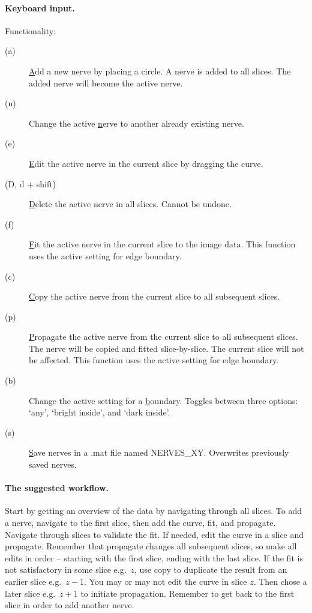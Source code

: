 \documentclass[paper=a4, fontsize=8pt]{article}
\begin{document}
\paragraph{Keyboard input.} Functionality:
\begin{description}
		\item[(a)] \underline{A}dd a new nerve by placing a circle. A nerve is added to all slices. The added nerve will become the active nerve.
		\item[(n)] Change the active \underline{n}erve to another already existing nerve. 
		\item[(e)] \underline{E}dit the active nerve in the current slice by dragging the curve.
		\item[(D, d + shift)] \underline{D}elete the active nerve in all slices. Cannot be undone.
		\item[(f)] \underline{F}it the active nerve in the current slice to the image data. This function uses the active setting for edge boundary. %
		\item[(c)] \underline{C}opy the active nerve from the current slice to all subsequent slices. %
		\item[(p)] \underline{P}ropagate the active nerve from the current slice to all subsequent slices. The nerve will be copied and fitted slice-by-slice. The current slice will not be affected. This function uses the active setting for edge boundary. %
		\item[(b)] Change the active setting for a \underline{b}oundary. Toggles between three options: `any', `bright inside', and `dark inside'.
		\item[(s)] \underline{S}ave nerves in a .mat file named NERVES\_XY. Overwrites previously saved nerves.
\end{description}

\paragraph{The suggested workflow.}
Start by getting an overview of the data by navigating through all slices. To add a nerve, navigate to the first slice, then add the curve, fit, and propagate. Navigate through slices to validate the fit. If needed, edit the curve in a slice and propagate. Remember that propagate changes all subsequent slices, so make all edits in order -- starting with the first slice, ending with the last slice. If the fit is not satisfactory in some slice e.g.\ $z$, use copy to duplicate the result from an earlier slice e.g.\ $z-1$. You may or may not edit the curve in slice $z$. Then chose a later slice e.g.\ $z+1$ to initiate propagation. Remember to get back to the first slice in order to add another nerve.    
\end{document}
